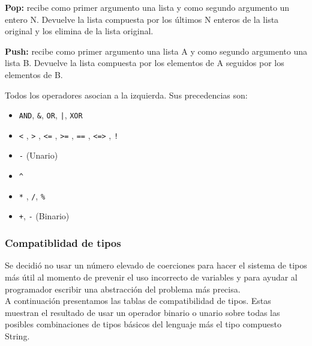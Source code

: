 \documentclass[12pt, spanish]{report}
\begin{document}
\textbf{Pop:} recibe como primer argumento una lista y como segundo
argumento un entero N. Devuelve la lista compuesta por los \'ultimos N
enteros de la lista original y los elimina de la lista original.

\textbf{Push:} recibe como primer argumento una lista A y como segundo
argumento una lista B. Devuelve la lista compuesta por los elementos de
A seguidos por los elementos de B.

Todos los operadores asocian a la izquierda. Sus precedencias son:
\begin{itemize}
\item \texttt{AND}, \texttt{\&}, \texttt{OR}, \texttt{|}, \texttt{XOR}
\item \texttt{<} , \texttt{>} , \texttt{<=} , \texttt{>=} , \texttt{==} , \texttt{<=>} , \texttt{!}
\item \texttt{-} (Unario)
\item \texttt{\^}
\item \texttt{*} ,  \texttt{/}, \texttt{\%}
\item \texttt{+}, \texttt{-} (Binario)
\end{itemize}

\subsubsection{Compatiblidad de tipos}
Se decidi\'o no usar un n\'umero elevado de coerciones para hacer el
sistema de tipos m\'as \'util al momento de prevenir el uso incorrecto
de variables y para ayudar al programador escribir una abstracci\'on del
problema m\'as precisa.\\
\indent A continuaci\'on presentamos las tablas de compatibilidad de
tipos. Estas muestran el resultado de usar un operador binario o unario sobre
todas las posibles combinaciones de tipos b\'asicos del lenguaje m\'as
el tipo compuesto String.\\
\end{document}
